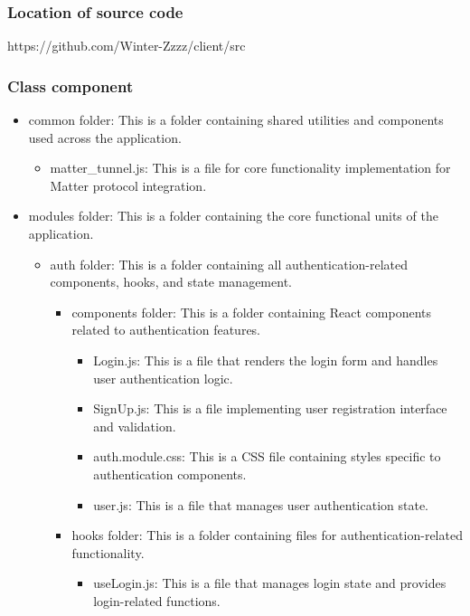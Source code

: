 \documentclass[conference]{IEEEtran}
\begin{document}
\subsubsection{Location of source code}
https://github.com/Winter-Zzzz/client/src

\subsubsection{Class component}
\begin{itemize}
	\item common folder: This is a folder containing shared utilities and components used across the application.
	      \begin{itemize}
	      	\item matter\_tunnel.js: This is a file for core functionality implementation for Matter protocol integration.
	      \end{itemize}
	\item modules folder: This is a folder containing the core functional units of the application.
	      \begin{itemize}
	      	\item auth folder: This is a folder containing all authentication-related components, hooks, and state management.
	      	      \begin{itemize}
	      	      	\item components folder: This is a folder containing React components related to authentication features.
	      	      	      \begin{itemize}
	      	      	      	\item Login.js: This is a file that renders the login form and handles user authentication logic.
	      	      	      	\item SignUp.js: This is a file implementing user registration interface and validation.
	      	      	      	\item auth.module.css: This is a CSS file containing styles specific to authentication components.
	      	      	      	\item user.js: This is a file that manages user authentication state.
	      	      	      \end{itemize}
	      	      	\item hooks folder: This is a folder containing files for authentication-related functionality.
	      	      	      \begin{itemize}
	      	      	      	\item useLogin.js: This is a file that manages login state and provides login-related functions.

\end{itemize}
\end{itemize}
\end{itemize}
\end{itemize}
\end{document}

